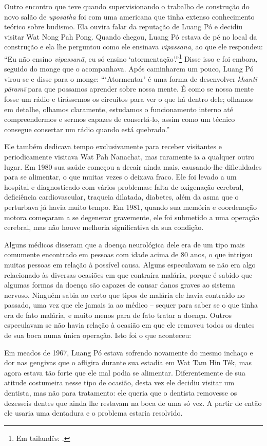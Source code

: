 Outro encontro que teve quando supervisionando o trabalho de construção
do novo salão de \emph{uposatha} foi com uma americana que tinha extenso
conhecimento teórico sobre budismo. Ela ouvira falar da reputação de
Luang Pó e decidiu visitar Wat Nong Pah Pong. Quando chegou, Luang Pó
estava de pé no local da construção e ela lhe perguntou como ele
ensinava \emph{vipassanā}, ao que ele respondeu: ``Eu não ensino
\emph{vipassanā}, eu só ensino `atormentação'.''\footnote{Em tailandês:
  .} Disse isso e foi embora, seguido do monge que o
acompanhava. Após caminharem um pouco, Luang Pó virou-se e disse para o
monge: ``\thinspace `Atormentar' é uma forma de desenvolver \emph{khanti pāramī}
para que possamos aprender sobre nossa mente. É como se nossa mente
fosse um rádio e tirássemos os circuitos para ver o que há dentro dele;
olhamos em detalhe, olhamos claramente, estudamos o funcionamento
interno até compreendermos e sermos capazes de consertá-lo, assim como
um técnico consegue consertar um rádio quando está quebrado.''

Ele também dedicava tempo exclusivamente para receber visitantes e
periodicamente visitava Wat Pah Nanachat, mas raramente ia a qualquer
outro lugar. Em 1980 sua saúde começou a decair ainda mais, causando-lhe
dificuldades para se alimentar, o que muitas vezes o deixava fraco. Ele
foi levado a um hospital e diagnosticado com vários problemas: falta de
oxigenação cerebral, deficiência cardiovascular, traqueia dilatada,
diabetes, além da asma que o perturbava já havia muito tempo. Em 1981,
quando sua memória e coordenação motora começaram a se degenerar
gravemente, ele foi submetido a uma operação cerebral, mas não houve
melhoria significativa da sua condição.

Alguns médicos disseram que a doença neurológica dele era de um tipo
mais comumente encontrado em pessoas com idade acima de 80 anos, o que
intrigou muitas pessoas em relação à possível causa. Alguns especulavam
se não era algo relacionado às diversas ocasiões em que contraíra
malária, porque é sabido que algumas formas da doença são capazes de
causar danos graves ao sistema nervoso. Ninguém sabia ao certo que tipos
de malária ele havia contraído no passado, uma vez que ele jamais ia ao
médico -- sequer para saber se o que tinha era de fato malária, e muito
menos para de fato tratar a doença. Outros especulavam se não havia
relação à ocasião em que ele removeu todos os dentes de sua boca numa
única operação. Isto foi o que aconteceu:

Em meados de 1967, Luang Pó estava sofrendo novamente do mesmo inchaço e
dor nas gengivas que o afligira durante sua estadia em Wat Tam Hin Ték,
mas agora estava tão forte que ele mal podia se alimentar.
Diferentemente de sua atitude costumeira nesse tipo de ocasião, desta
vez ele decidiu visitar um dentista, mas não para tratamento: ele queria
que o dentista removesse os dezesseis dentes que ainda lhe restavam na
boca de uma só vez. A partir de então ele usaria uma dentadura e o
problema estaria resolvido.

